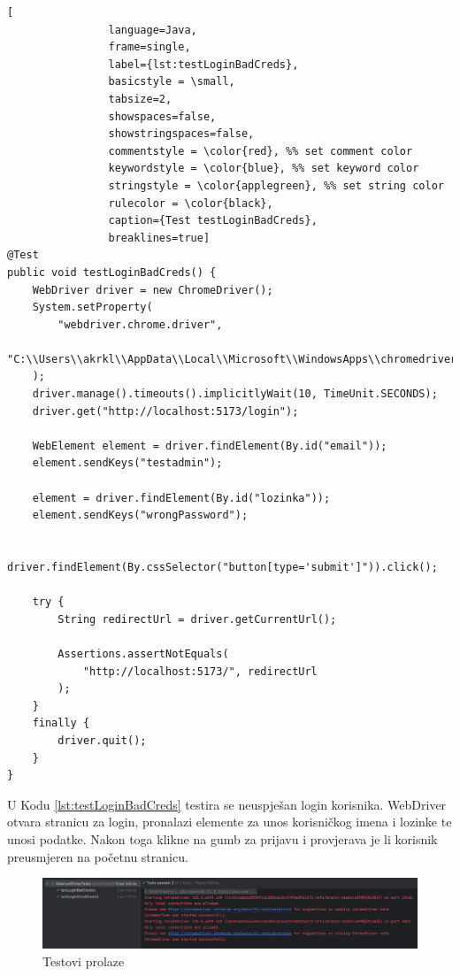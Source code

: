 			\begin{lstlisting}[
				language=Java,
				frame=single,
				label={lst:testLoginBadCreds},
				basicstyle = \small,
				tabsize=2,
				showspaces=false,
				showstringspaces=false,
				commentstyle = \color{red}, %% set comment color
				keywordstyle = \color{blue}, %% set keyword color
				stringstyle = \color{applegreen}, %% set string color
				rulecolor = \color{black},
				caption={Test testLoginBadCreds},
				breaklines=true]
@Test
public void testLoginBadCreds() {
	WebDriver driver = new ChromeDriver();
	System.setProperty(
		"webdriver.chrome.driver",
		"C:\\Users\\akrkl\\AppData\\Local\\Microsoft\\WindowsApps\\chromedriver.exe"
	);
	driver.manage().timeouts().implicitlyWait(10, TimeUnit.SECONDS);
	driver.get("http://localhost:5173/login");

	WebElement element = driver.findElement(By.id("email"));
	element.sendKeys("testadmin");

	element = driver.findElement(By.id("lozinka"));
	element.sendKeys("wrongPassword");

	driver.findElement(By.cssSelector("button[type='submit']")).click();

	try {
		String redirectUrl = driver.getCurrentUrl();

		Assertions.assertNotEquals(
			"http://localhost:5173/", redirectUrl
		);
	}
	finally {
		driver.quit();
	}
}
			\end{lstlisting}
			
			U Kodu \ref{lst:testLoginBadCreds} testira se neuspješan login korisnika. WebDriver otvara stranicu za login, pronalazi elemente za unos korisničkog imena i lozinke te unosi podatke. Nakon toga klikne na gumb za prijavu i provjerava je li korisnik preusmjeren na početnu stranicu.
			
			\pagebreak
			
			\begin{figure}[!htb]
				\centering
				\includegraphics[width=\textwidth]{slike/test_passed.png}
				\caption{Testovi prolaze}
			\end{figure}
			
